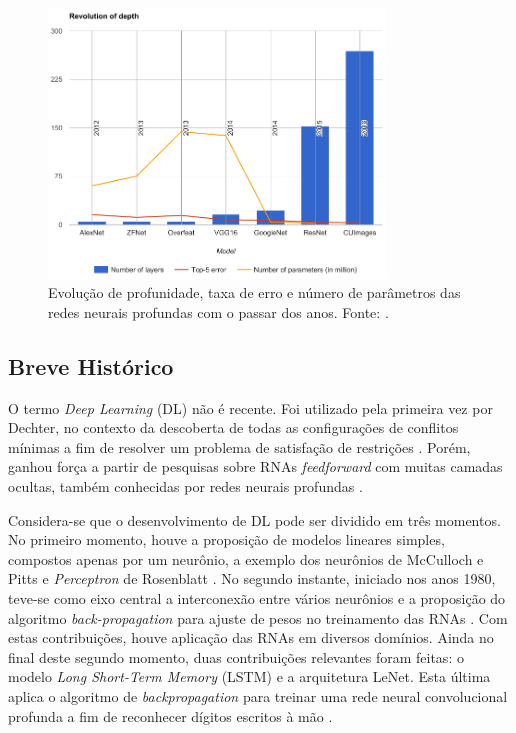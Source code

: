 \begin{figure}[ht]
	\centering
	\caption{Evolução de profunidade, taxa de erro e número de parâmetros das redes neurais profundas com o passar dos anos. Fonte: \cite{mediumcnn}.}
	\label{fig:compara_redes}
	\includegraphics[width=0.8\textwidth]{img/compara_redes.png}
\end{figure}

\subsection{Breve Histórico}

O termo \emph{Deep Learning} (DL) não é recente. Foi utilizado pela primeira vez por Dechter, no contexto da descoberta de todas as configurações de conflitos mínimas a fim de resolver um problema de satisfação de restrições \cite{dechter1986learning}. Porém, ganhou força a partir de pesquisas sobre RNAs \emph{feedforward} com muitas camadas ocultas, também conhecidas por redes neurais profundas \cite{deng2014deep}.

Considera-se que o desenvolvimento de DL pode ser dividido em três momentos. No primeiro momento, houve a proposição de modelos lineares simples, compostos apenas por um neurônio, a exemplo dos neurônios de McCulloch e Pitts \cite{mcculloch1943logical} e \emph{Perceptron} de Rosenblatt  \cite{rosenblatt1958perceptron}. No segundo instante, iniciado nos anos 1980, teve-se como eixo central a interconexão entre vários neurônios e a proposição do algoritmo \emph{back-propagation} para ajuste de pesos no treinamento das RNAs \cite{rumelhart1986parallel,rumelhart1986backpropagation}. Com estas contribuições, houve aplicação das RNAs em diversos domínios. Ainda no final deste segundo momento, duas contribuições relevantes foram feitas: o modelo \emph{Long Short-Term Memory} (LSTM) e a arquitetura LeNet. Esta última aplica o algoritmo de \emph{backpropagation} para treinar uma rede neural convolucional profunda a fim de reconhecer dígitos escritos à mão \cite{lenet}.

